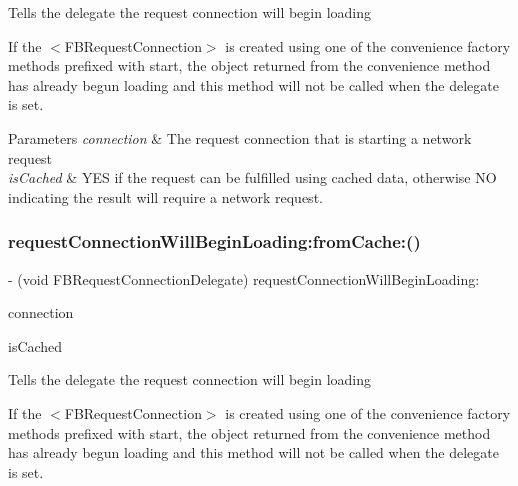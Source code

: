 Tells the delegate the request connection will begin loading

If the $<$\+F\+B\+Request\+Connection$>$ is created using one of the convenience factory methods prefixed with start, the object returned from the convenience method has already begun loading and this method will not be called when the delegate is set.


\begin{DoxyParams}{Parameters}
{\em connection} & The request connection that is starting a network request \\
\hline
{\em is\+Cached} & Y\+ES if the request can be fulfilled using cached data, otherwise NO indicating the result will require a network request. \\
\hline
\end{DoxyParams}
\mbox{\label{protocolFBRequestConnectionDelegate_01-p_a8e31e2b5023edb3b869c0cd0be288a29}} 
\subsubsection{\texorpdfstring{request\+Connection\+Will\+Begin\+Loading\+:from\+Cache\+:()}{requestConnectionWillBeginLoading:fromCache:()}\hspace{0.1cm}{\footnotesize\ttfamily [2/5]}}
{\footnotesize\ttfamily -\/ (void F\+B\+Request\+Connection\+Delegate) request\+Connection\+Will\+Begin\+Loading\+: \begin{DoxyParamCaption}\item[{(\hyperlink{interfaceFBRequestConnection}{F\+B\+Request\+Connection} $\ast$)}]{connection }\item[{fromCache:(B\+O\+OL)}]{is\+Cached }\end{DoxyParamCaption}\hspace{0.3cm}{\ttfamily [optional]}}

Tells the delegate the request connection will begin loading

If the $<$\+F\+B\+Request\+Connection$>$ is created using one of the convenience factory methods prefixed with start, the object returned from the convenience method has already begun loading and this method will not be called when the delegate is set.


